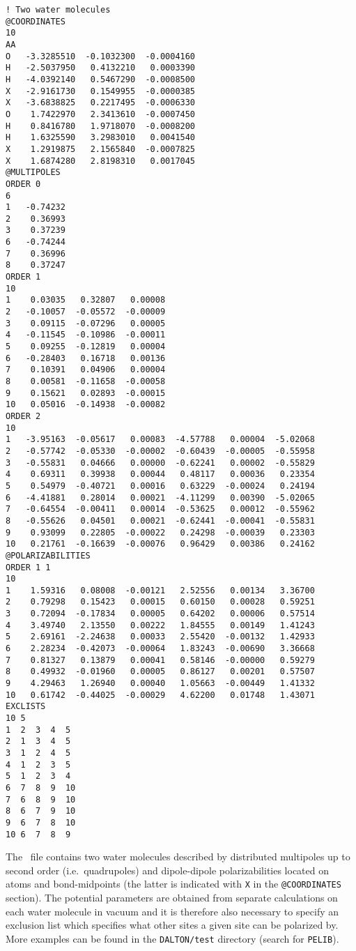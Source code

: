 \begin{verbatim}
! Two water molecules
@COORDINATES
10
AA
O   -3.3285510  -0.1032300  -0.0004160
H   -2.5037950   0.4132210   0.0003390
H   -4.0392140   0.5467290  -0.0008500
X   -2.9161730   0.1549955  -0.0000385
X   -3.6838825   0.2217495  -0.0006330
O    1.7422970   2.3413610  -0.0007450
H    0.8416780   1.9718070  -0.0008200
H    1.6325590   3.2983010   0.0041540
X    1.2919875   2.1565840  -0.0007825
X    1.6874280   2.8198310   0.0017045
@MULTIPOLES
ORDER 0
6
1   -0.74232
2    0.36993
3    0.37239
6   -0.74244
7    0.36996
8    0.37247
ORDER 1
10
1    0.03035   0.32807   0.00008
2   -0.10057  -0.05572  -0.00009
3    0.09115  -0.07296   0.00005
4   -0.11545  -0.10986  -0.00011
5    0.09255  -0.12819   0.00004
6   -0.28403   0.16718   0.00136
7    0.10391   0.04906   0.00004
8    0.00581  -0.11658  -0.00058
9    0.15621   0.02893  -0.00015
10   0.05016  -0.14938  -0.00082
ORDER 2
10
1   -3.95163  -0.05617   0.00083  -4.57788   0.00004  -5.02068
2   -0.57742  -0.05330  -0.00002  -0.60439  -0.00005  -0.55958
3   -0.55831   0.04666   0.00000  -0.62241   0.00002  -0.55829
4    0.69311   0.39938   0.00044   0.48117   0.00036   0.23354
5    0.54979  -0.40721   0.00016   0.63229  -0.00024   0.24194
6   -4.41881   0.28014   0.00021  -4.11299   0.00390  -5.02065
7   -0.64554  -0.00411   0.00014  -0.53625   0.00012  -0.55962
8   -0.55626   0.04501   0.00021  -0.62441  -0.00041  -0.55831
9    0.93099   0.22805  -0.00022   0.24298  -0.00039   0.23303
10   0.21761  -0.16639  -0.00076   0.96429   0.00386   0.24162
@POLARIZABILITIES
ORDER 1 1
10
1    1.59316   0.08008  -0.00121   2.52556   0.00134   3.36700
2    0.79298   0.15423   0.00015   0.60150   0.00028   0.59251
3    0.72094  -0.17834   0.00005   0.64202   0.00006   0.57514
4    3.49740   2.13550   0.00222   1.84555   0.00149   1.41243
5    2.69161  -2.24638   0.00033   2.55420  -0.00132   1.42933
6    2.28234  -0.42073  -0.00064   1.83243  -0.00690   3.36668
7    0.81327   0.13879   0.00041   0.58146  -0.00000   0.59279
8    0.49932  -0.01960   0.00005   0.86127   0.00201   0.57507
9    4.29463   1.26940   0.00040   1.05663  -0.00449   1.41332
10   0.61742  -0.44025  -0.00029   4.62200   0.01748   1.43071
EXCLISTS
10 5
1  2  3  4  5
2  1  3  4  5
3  1  2  4  5
4  1  2  3  5
5  1  2  3  4
6  7  8  9  10
7  6  8  9  10
8  6  7  9  10
9  6  7  8  10
10 6  7  8  9
\end{verbatim}
The \potinp\ file contains two water molecules described by distributed 
multipoles up to second order (i.e.\ quadrupoles) and dipole-dipole polarizabilities
located on atoms and bond-midpoints (the latter is indicated with \verb|X| in the \verb|@COORDINATES|
section). The potential parameters are obtained from separate calculations on each 
water molecule in vacuum and it is therefore also necessary to specify 
an exclusion list which specifies what other sites a given site can be polarized by.
More examples can be found in the \verb|DALTON/test| directory (search for 
\verb|PELIB|).

